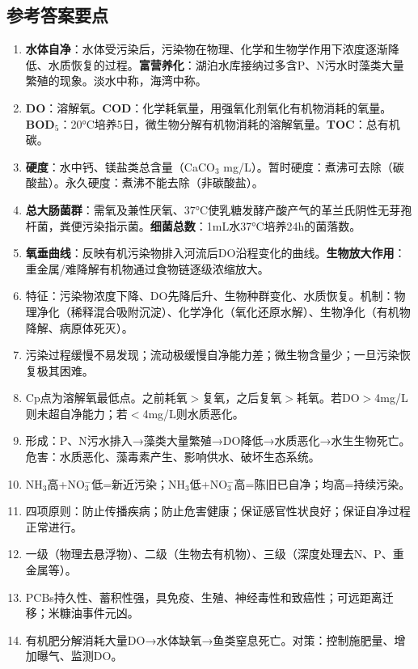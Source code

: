 \subsection*{参考答案要点}

\begin{enumerate}[leftmargin=*, itemsep=5pt]
    \item \textbf{水体自净}：水体受污染后，污染物在物理、化学和生物学作用下浓度逐渐降低、水质恢复的过程。\textbf{富营养化}：湖泊水库接纳过多含P、N污水时藻类大量繁殖的现象。淡水中称，海湾中称。

    \item \textbf{DO}：溶解氧。\textbf{COD}：化学耗氧量，用强氧化剂氧化有机物消耗的氧量。\textbf{BOD$_5$}：20°C培养5日，微生物分解有机物消耗的溶解氧量。\textbf{TOC}：总有机碳。

    \item \textbf{硬度}：水中钙、镁盐类总含量（CaCO$_3$ mg/L）。暂时硬度：煮沸可去除（碳酸盐）。永久硬度：煮沸不能去除（非碳酸盐）。

    \item \textbf{总大肠菌群}：需氧及兼性厌氧、37°C使乳糖发酵产酸产气的革兰氏阴性无芽孢杆菌，粪便污染指示菌。\textbf{细菌总数}：1mL水37°C培养24h的菌落数。

    \item \textbf{氧垂曲线}：反映有机污染物排入河流后DO沿程变化的曲线。\textbf{生物放大作用}：重金属/难降解有机物通过食物链逐级浓缩放大。

    \item 特征：污染物浓度下降、DO先降后升、生物种群变化、水质恢复。机制：物理净化（稀释混合吸附沉淀）、化学净化（氧化还原水解）、生物净化（有机物降解、病原体死灭）。

    \item 污染过程缓慢不易发现；流动极缓慢自净能力差；微生物含量少；一旦污染恢复极其困难。

    \item Cp点为溶解氧最低点。之前耗氧$>$复氧，之后复氧$>$耗氧。若DO$>$4mg/L则未超自净能力；若$<$4mg/L则水质恶化。

    \item 形成：P、N污水排入→藻类大量繁殖→DO降低→水质恶化→水生生物死亡。危害：水质恶化、藻毒素产生、影响供水、破坏生态系统。

    \item NH$_3$高+NO$_3^-$低=新近污染；NH$_3$低+NO$_3^-$高=陈旧已自净；均高=持续污染。

    \item 四项原则：防止传播疾病；防止危害健康；保证感官性状良好；保证自净过程正常进行。

    \item 一级（物理去悬浮物）、二级（生物去有机物）、三级（深度处理去N、P、重金属等）。

    \item PCBs持久性、蓄积性强，具免疫、生殖、神经毒性和致癌性；可远距离迁移；米糠油事件元凶。

    \item 有机肥分解消耗大量DO→水体缺氧→鱼类窒息死亡。对策：控制施肥量、增加曝气、监测DO。
\end{enumerate}

